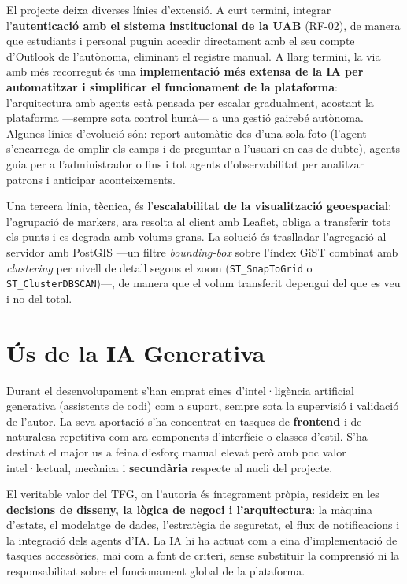 \documentclass[10pt,a4paper,twocolumn,twoside]{article}
\begin{document}
		El projecte deixa diverses línies d'extensió. A curt termini, integrar l'\textbf{autenticació amb el sistema institucional de la UAB} (RF-02), de manera que estudiants i personal puguin accedir directament amb el seu compte d'Outlook de l'autònoma, eliminant el registre manual. A llarg termini, la via amb més recorregut és una \textbf{implementació més extensa de la IA per automatitzar i simplificar el funcionament de la plataforma}: l'arquitectura amb agents està pensada per escalar gradualment, acostant la plataforma —sempre sota control humà— a una gestió gairebé autònoma. Algunes línies d'evolució són: report automàtic des d'una sola foto (l'agent s'encarrega de omplir els camps i de preguntar a l'usuari en cas de dubte), agents guia per a l'administrador o fins i tot agents d'observabilitat per analitzar patrons i anticipar aconteixements. 
		
		Una tercera línia, tècnica, és l'\textbf{escalabilitat de la visualització geoespacial}: l'agrupació de markers, ara resolta al client amb Leaflet, obliga a transferir tots els punts i es degrada amb volums grans. La solució és traslladar l'agregació al servidor amb PostGIS —un filtre \textit{bounding-box} sobre l'índex GiST combinat amb \textit{clustering} per nivell de detall segons el zoom (\texttt{ST\_SnapToGrid} o \texttt{ST\_ClusterDBSCAN})—, de manera que el volum transferit depengui del que es veu i no del total.
		
		
		\section*{Ús de la IA Generativa}
		
		Durant el desenvolupament s'han emprat eines d'intel·ligència artificial generativa (assistents de codi) com a suport, sempre sota la supervisió i validació de l'autor. La seva aportació s'ha concentrat en tasques de \textbf{frontend} i de naturalesa repetitiva com ara components d'interfície o classes d'estil. S'ha destinat el major us a feina d'esforç manual elevat però amb poc valor intel·lectual, mecànica i \textbf{secundària} respecte al nucli del projecte.
		
		El veritable valor del TFG, on l'autoria és íntegrament pròpia, resideix en les \textbf{decisions de disseny, la lògica de negoci i l'arquitectura}: la màquina d'estats, el modelatge de dades, l'estratègia de seguretat, el flux de notificacions i la integració dels agents d'IA. La IA hi ha actuat com a eina d'implementació de tasques accessòries, mai com a font de criteri, sense substituir la comprensió ni la responsabilitat sobre el funcionament global de la plataforma.
		
\end{document}
